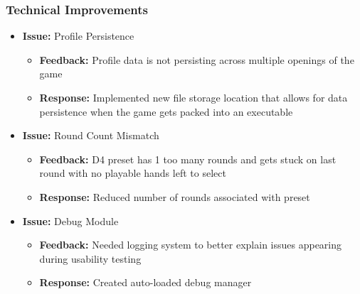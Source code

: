 \documentclass{article}
\begin{document}
\subsubsection{Technical Improvements}
\begin{itemize}
    \item \textbf{Issue:} Profile Persistence
    \begin{itemize}
        \item \textbf{Feedback:} Profile data is not persisting across multiple openings of the game
        \item \textbf{Response:} Implemented new file storage location that allows for data persistence when the game gets packed into an executable
    \end{itemize}
    
    \item \textbf{Issue:} Round Count Mismatch
    \begin{itemize}
        \item \textbf{Feedback:} D4 preset has 1 too many rounds and gets stuck on last round with no playable hands left to select
        \item \textbf{Response:} Reduced number of rounds associated with preset
    \end{itemize}
    
    \item \textbf{Issue:} Debug Module
    \begin{itemize}
        \item \textbf{Feedback:} Needed logging system to better explain issues appearing during usability testing
        \item \textbf{Response:} Created auto-loaded debug manager
    \end{itemize}
\end{itemize}
\end{document}
